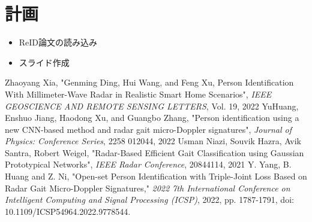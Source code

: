 \documentclass[dvipdfmx]{jsarticle}
\begin{document}
\section{計画}
\begin{itemize}
    \item ReID論文の読み込み
    \item スライド作成
\end{itemize}

\begin{thebibliography}{}
 Zhaoyang Xia, "Genming Ding, Hui Wang, and Feng Xu, Person Identification With Millimeter-Wave Radar in Realistic Smart Home Scenarios", \textit{IEEE GEOSCIENCE AND REMOTE SENSING LETTERS}, Vol. 19, 2022
 YuHuang, Enshuo Jiang, Haodong Xu, and Guangbo Zhang, "Person identification using a new CNN-based method and radar gait micro-Doppler signatures", \textit{Journal of Physics: Conference Series}, 2258 012044, 2022
 Usman Niazi, Souvik Hazra, Avik Santra, Robert Weigel, "Radar-Based Efficient Gait Classification using Gaussian Prototypical Networks", \textit{IEEE Radar Conference}, 20844114, 2021
Y. Yang, B. Huang and Z. Ni, "Open-set Person Identification with Triple-Joint Loss Based on Radar Gait Micro-Doppler Signatures," \textit{2022 7th International Conference on Intelligent Computing and Signal Processing (ICSP)}, 2022, pp. 1787-1791, doi: 10.1109/ICSP54964.2022.9778544.
\end{thebibliography}
\end{document}
